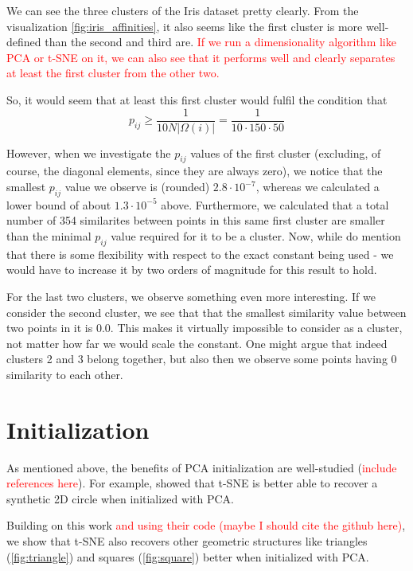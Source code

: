 We can see the three clusters of the Iris dataset pretty clearly. 
From the visualization \ref{fig:iris_affinities}, it also seems like the first cluster is more well-defined than the second and third are. 
\textcolor{red}{If we run a dimensionality algorithm like PCA or t-SNE on it, we can also see that it performs well and clearly separates at least the first cluster from the other two.} 

So, it would seem that at least this first cluster would fulfil the condition that \begin{equation} p_{ij} \geq \frac{1}{10 N |\Omega(i)|} = \frac{1}{10 \cdot 150 \cdot 50} \end{equation}

However, when we investigate the $p_{ij}$ values of the first cluster (excluding, of course, the diagonal elements, since they are always zero), we notice that the smallest $p_{ij}$ value we observe is (rounded) $2.8 \cdot 10^{-7}$, whereas we calculated a lower bound of about $1.3 \cdot 10^{-5}$ above.
Furthermore, we calculated that a total number of 354 similarites between points in this same first cluster are smaller than the minimal $p_{ij}$ value required for it to be a cluster. 
Now, while \cite{LinStei22} do mention that there is some flexibility with respect to the exact constant being used - we would have to increase it by two orders of magnitude for this result to hold. 

For the last two clusters, we observe something even more interesting. 
If we consider the second cluster, we see that that the smallest similarity value between two points in it is $0.0$. 
This makes it virtually impossible to consider as a cluster, not matter how far we would scale the constant. 
One might argue that indeed clusters 2 and 3 belong together, but also then we observe some points having $0$ similarity to each other. 

\section{Initialization}
As mentioned above, the benefits of PCA initialization are well-studied (\textcolor{red}{include references here}). 
For example, \cite{kobak21} showed that t-SNE is better able to recover a synthetic 2D circle when initialized with PCA. 

Building on this work \textcolor{red}{and using their code (maybe I should cite the github here)}, we show that t-SNE also recovers other geometric structures like triangles (\ref{fig:triangle}) and squares (\ref{fig:square}) better when initialized with PCA. 

